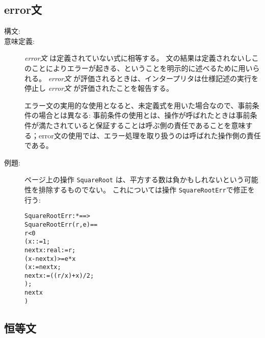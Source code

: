 \documentclass[\pformat,12pt]{jarticle}
\begin{document}
\subsection{error文}

\begin{description}
\item[構文:]


\item[意味定義:]  {\it error文} は定義されていない式に相等する。
文の結果は定義されないしこのことによりエラーが起きる、ということを明示的に述べるために用いられる。
{\it error文} が評価されるときは、インタープリタは仕様記述の実行を停止し {\it error文} が評価されたことを報告する。

エラー文の実用的な使用となると、未定義式を用いた場合なので、事前条件の場合とは異なる:  事前条件の使用とは、操作が呼ばれたときは事前条件が満たされていると保証することは呼ぶ側の責任であることを意味する；error文の使用では、エラー処理を取り扱うのは呼ばれた操作側の責任である。


\item[例題:] \pageref{squarerootDef} ページ上の操作 \texttt{SquareRoot} は、平方する数は負かもしれないという可能性を排除するものでない。
これについては操作 \texttt{SquareRootErr}で修正を行う:
  \begin{alltt}
  SquareRootErr :  *  ==> 
  SquareRootErr (r,e) ==
     r < 0
      ( x: := 1;
        nextx\keyw:{real} := r;
        (x - nextx) >= e * x 
         ( x := nextx;
           nextx := ((r / x) + x) / 2;
         );
        nextx
      )
  \end{alltt}
\end{description}

\subsection{恒等文}
\end{document}
